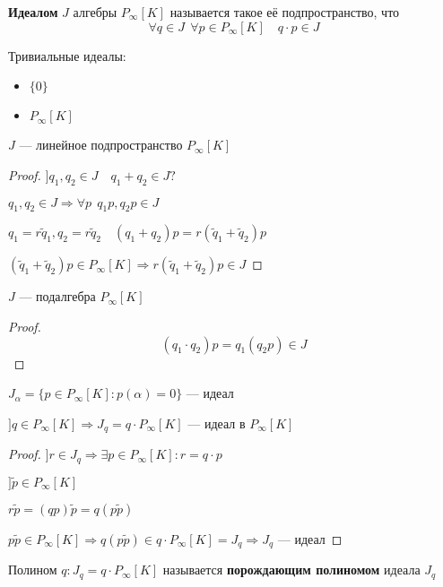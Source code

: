 \begin{definition}
    \textbf{Идеалом} $J$ алгебры $P_\infty[K]$ называется такое её подпространство, что
    $$\forall q\in J \ \ \forall p\in P_\infty[K] \quad q\cdot p\in J$$
\end{definition}
\begin{example}
    Тривиальные идеалы:
    \begin{itemize}
        \item $\{0\}$
        \item $P_\infty[K]$
    \end{itemize}
\end{example}
\begin{lemma}
    $J$ --- линейное подпространство $P_\infty[K]$
\end{lemma}
\begin{proof}
    $] q_1, q_2\in J \quad q_1+q_2\in J?$

    $q_1, q_2\in J \Rightarrow \forall p \ \ q_1p, q_2p\in J$

    $q_1=r\tilde q_1, q_2=r\tilde q_2 \quad (q_1+q_2)p=r(\tilde q_1+\tilde q_2)p$

    $(\tilde q_1+\tilde q_2)p\in P_\infty[K] \Rightarrow r(\tilde q_1+\tilde q_2)p\in J$
\end{proof}
\begin{lemma}
    $J$ --- подалгебра $P_\infty[K]$
\end{lemma}
\begin{proof}
    $$(q_1\cdot q_2)p=q_1(q_2 p)\in J$$
\end{proof}
\begin{example}
    $J_\alpha=\{p\in P_\infty[K] : p(\alpha)=0\}$ --- идеал
\end{example}
\begin{lemma}
    $] q\in P_\infty[K] \Rightarrow J_q=q\cdot P_\infty[K]$ --- идеал в $P_\infty[K]$
\end{lemma}
\begin{proof}
    $] r\in J_q \Rightarrow \exists p\in P_\infty[K] : r = q\cdot p$

    $] \tilde p\in P_\infty[K]$

    $r\tilde p = (qp)\tilde p=q(p\tilde p)$
    
    $p\tilde p \in P_\infty[K] \Rightarrow q(p\tilde p)\in q\cdot P_\infty[K]=J_q \Rightarrow J_q \text{ --- идеал}$
\end{proof}
\begin{definition}
    Полином $q : J_q = q\cdot P_\infty[K]$ называется \textbf{порождающим полиномом} идеала $J_q$
\end{definition}
